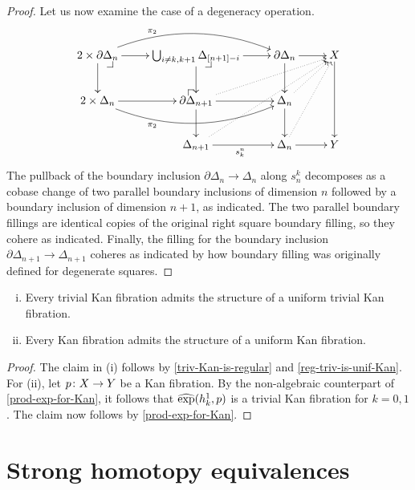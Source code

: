 \documentclass[reqno,10pt,a4paper,oneside]{amsart}
\begin{document}
\begin{proof}
Let us now examine the case of a degeneracy operation.
\[
\xymatrix{
  2 \times \partial \Delta_n
  \ar[r]
  \ar[d]
  \ar@/^2em/[rr]^(0.3){\pi_2}
  \pullback{dr}
&
  \bigcup_{i \neq k, k+1} \Delta_{[n+1] - i}
  \ar[r]
  \ar[d]
  \pullback{dr}
&
  \partial \Delta_n
  \ar[d]
  \ar[r]
&
  X
  \ar[dd]
\\
  2 \times \Delta_n
  \ar[r]
  \ar@/_2em/[rr]_(0.3){\pi_2}
&
  \partial \Delta_{n+1}
  \ar[r]
  \ar[d]
  \ar@{.>}[urr]
  \pullback{ul}
&
  \Delta_n
  \ar[d]
  \ar@{.>}[ur]
\\&
  \Delta_{n+1}
  \ar[r]_{s_k^n}
  \ar@{.>}[uurr]
&
  \Delta_n
  \ar[r]
  \ar@{.>}[uur]
&
  Y
}
\]
The pullback of the boundary inclusion $\partial \Delta_n \to \Delta_n$ along $s^k_n$ decomposes as a cobase change of two parallel boundary inclusions of dimension $n$ followed by a boundary inclusion of dimension $n+1$,
as indicated.
The two parallel boundary fillings are identical copies of the original right square boundary filling, so they cohere as indicated.
Finally, the filling for the boundary inclusion~$\partial \Delta_{n+1} \to \Delta_{n+1}$ coheres as indicated by how boundary filling was originally defined for degenerate squares.
\end{proof}











\begin{theorem}[ZFC]  \hfill 
\begin{enumerate}[(i)]
\item  Every trivial Kan fibration admits the structure of a uniform trivial Kan fibration.
\item Every Kan fibration admits the structure of a uniform  Kan fibration.
\end{enumerate} 
\end{theorem}

\begin{proof} The claim in (i) follows by \cref{triv-Kan-is-regular}  and \cref{reg-triv-is-unif-Kan}. For (ii), let
$p \colon X \to Y$ be a Kan fibration. By the non-algebraic counterpart of \cref{prod-exp-for-Kan}, it follows 
that $\operatorname{\widehat{exp}}(h_k^1, p)$ is a trivial Kan fibration for $k = 0, 1$. The claim now follows  by \cref{prod-exp-for-Kan}. 
\end{proof}


\section{Strong homotopy equivalences}
\end{document}
